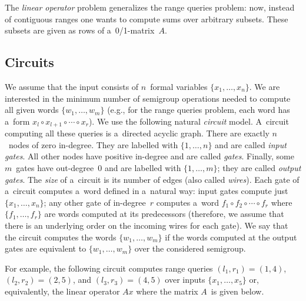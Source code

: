 \documentclass[11pt,letterpaper]{article}
\begin{document}
The {\em linear operator} problem generalizes the range
queries problem: now, instead of contiguous ranges one wants
to compute sums over arbitrary subsets. These subsets are
given as rows of a~0/1-matrix~$A$.

\subsection{Circuits}\label{subsec:circuits}
We assume that the input consists of $n$~formal variables
$\{x_1, \dotsc, x_n\}$. We are interested in the minimum number of semigroup
operations needed to compute all given words $\{w_1, \dotsc, w_m\}$ (e.g., for
the range queries problem, each word has a~form $x_l\circ x_{l+1}\circ \dotsb \circ x_r$). We use
the following natural {\em circuit} model. A~circuit computing all these queries
is a~directed acyclic graph. There are exactly $n$~nodes of zero in-degree. They
are labelled with $\{1, \dotsc, n\}$ and are called {\em input gates}. All
other nodes have positive in-degree and are called {\em gates}. Finally, some
$m$~gates have out-degree~0 and are labelled with $\{1, \dotsc, m\}$; they are called {\em output gates}. The
{\em size} of a~circuit is its number of edges (also called {\em wires}). Each
gate of a~circuit computes a~word defined in a~natural way: input gates compute
just $\{x_1, \dotsc, x_n\}$; any other gate of in-degree~$r$ computes a~word
$f_1 \circ f_2 \circ \dotsb \circ f_r$ where $\{f_1, \dotsc, f_r\}$ are words
computed at its predecessors (therefore, we assume that there is an underlying
order on the incoming wires for each gate). We say that the circuit computes the
words $\{w_1, \dotsc, w_m\}$ if the words computed at the output gates are
equivalent to $\{w_1, \dotsc, w_m\}$ over the considered semigroup.

For example, the following circuit computes range queries 
$(l_1,r_1)=(1,4)$,
$(l_2,r_2)=(2,5)$, and
$(l_3,r_3)=(4,5)$
over inputs $\{x_1, \dotsc, x_5\}$ or, equivalently, the
linear operator $Ax$ where the matrix $A$~is given below.

\begin{center}
\end{center}
\end{document}
